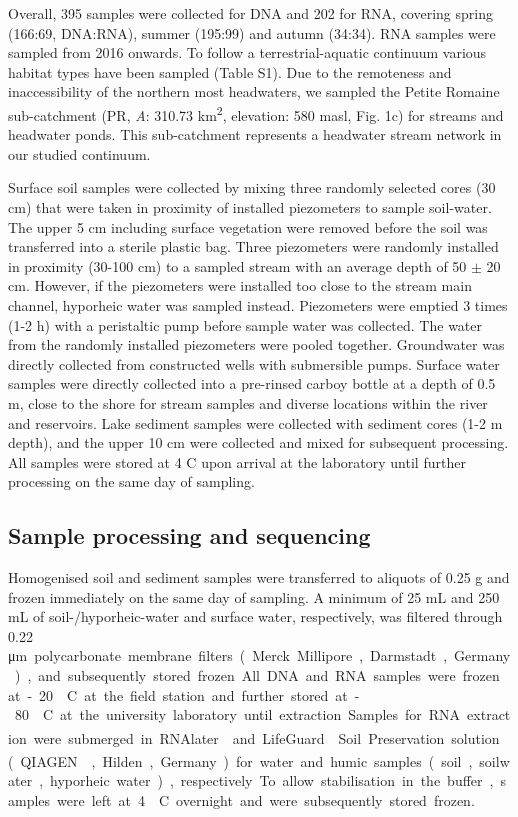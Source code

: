 \documentclass[12pt,a4paper]{article} %
\begin{document}
Overall, 395 samples were collected for DNA and 202 for RNA, covering spring (166:69, DNA:RNA), summer (195:99) and autumn (34:34). RNA samples were sampled from 2016 onwards. To follow a terrestrial-aquatic continuum various habitat types have been sampled (Table S1). Due to the remoteness and inaccessibility of the northern most headwaters, we sampled the Petite Romaine sub-catchment (PR, \textit{A}: 310.73 km\textsuperscript{2}, elevation: 580 masl, Fig. 1c) for streams and headwater ponds. This sub-catchment represents a headwater stream network in our studied continuum.

Surface soil samples were collected by mixing three randomly selected cores (30 cm) that were taken in proximity of installed piezometers to sample soil-water. The upper 5 cm including surface vegetation were removed before the soil was transferred into a sterile plastic bag. Three piezometers were randomly installed in proximity (30-100 cm) to a sampled stream with an average depth of 50 $\pm$ 20 cm. However, if the piezometers were installed too close to the stream main channel, hyporheic water was sampled instead. Piezometers were emptied 3 times (1-2 h) with a peristaltic pump before sample water was collected. The water from the randomly installed piezometers were pooled together. Groundwater was directly collected from constructed wells with submersible pumps. Surface water samples were directly collected into a pre-rinsed carboy bottle at a depth of 0.5 m, close to the shore for stream samples and diverse locations within the river and reservoirs. Lake sediment samples were collected with sediment cores (1-2 m depth), and the upper 10 cm were collected and mixed for subsequent processing. All samples were stored at 4 \textdegree{}C upon arrival at the laboratory until further processing on the same day of sampling.

\subsection*{Sample processing and sequencing}
Homogenised soil and sediment samples were transferred to aliquots of 0.25 g and frozen immediately on the same day of sampling. A minimum of 25 mL and 250 mL of soil-/hyporheic-water and surface water, respectively, was filtered through 0.22 \si\micro m polycarbonate membrane filters (Merck Millipore, Darmstadt, Germany), and subsequently stored frozen. All DNA and RNA samples were frozen at -20 \textdegree{}C at the field station and further stored at -80 \textdegree{}C at the university laboratory until extraction. Samples for RNA extraction were submerged in RNAlater\textsuperscript{\textregistered} and LifeGuard\textsuperscript{\textregistered} Soil Preservation solution (QIAGEN\textsuperscript{\textregistered}, Hilden, Germany) for water and humic samples (soil, soilwater, hyporheic water), respectively. To allow stabilisation in the buffer, samples were left at 4 \textdegree{}C overnight and were subsequently stored frozen.
\end{document}
